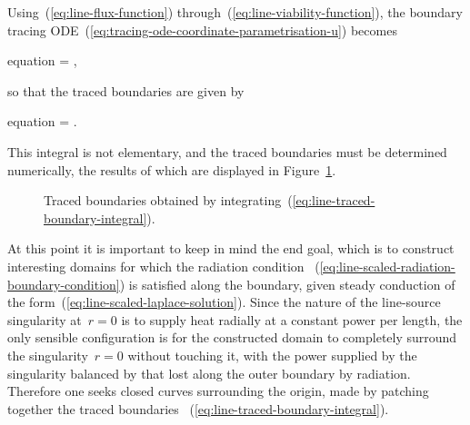 Using~(\ref{eq:line-flux-function})
through~(\ref{eq:line-viability-function}),
the boundary tracing ODE~(\ref{eq:tracing-ode-coordinate-parametrisation-u})
becomes
\begin{important}{equation}
   = \mp {},
  \label{eq:line-tracing-ode-coordinate-parametrisation-r}
\end{important}
so that the traced boundaries are given by
\begin{important}{equation}
  \phi = \mp \int {}.
  \label{eq:line-traced-boundary-integral}
\end{important}
This integral is not elementary,
and the traced boundaries must be determined numerically,
the results of which are displayed in Figure~\ref{fig:line-traced-boundaries}.

\begin{figure}
  \newcommand*{\subfigurewidth}{0.325\textwidth}
  \centering
  \begin{subfigure}{\subfigurewidth}
  \end{subfigure}
  \hfill
  \begin{subfigure}{\subfigurewidth}
  \end{subfigure}
  \hfill
  \begin{subfigure}{\subfigurewidth}
  \end{subfigure}
  \caption{
    Traced boundaries
    obtained by integrating~(\ref{eq:line-traced-boundary-integral}).
  }
  \label{fig:line-traced-boundaries}
\end{figure}

At this point it is important to keep in mind the end goal,
which is to construct interesting domains
for which the radiation condition~%
  (\ref{eq:line-scaled-radiation-boundary-condition})
is satisfied along the boundary,
given steady conduction of the form~(\ref{eq:line-scaled-laplace-solution}).
Since the nature of the line-source singularity at~$r = 0$
is to supply heat radially at a constant power per length,
the only sensible configuration is for the constructed domain to
completely surround the singularity~$r = 0$ without touching it,
with the power supplied by the singularity balanced
by that lost along the outer boundary by radiation.
Therefore one seeks closed curves surrounding the origin,
made by patching together the traced boundaries~%
  (\ref{eq:line-traced-boundary-integral}).

